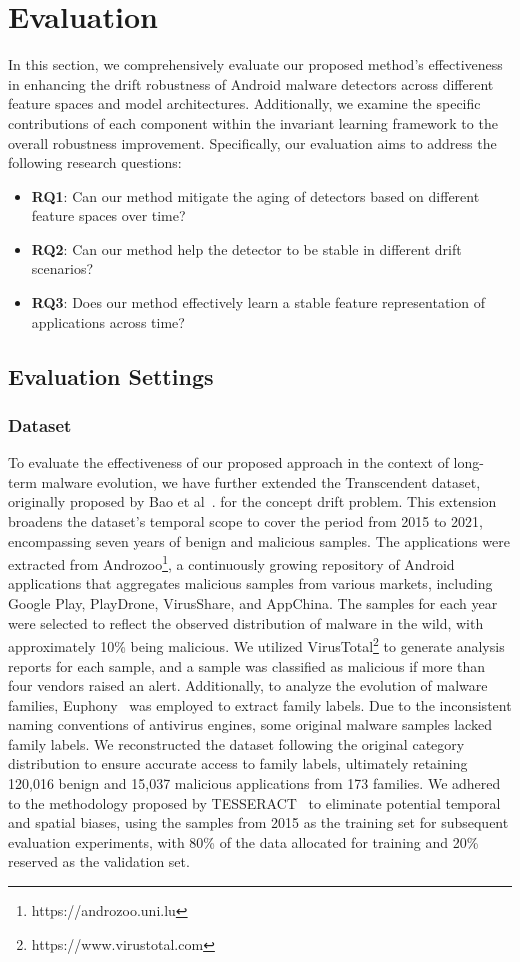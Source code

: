 \section{Evaluation}
In this section, we comprehensively evaluate our proposed method's effectiveness in enhancing the drift robustness of Android malware detectors across different feature spaces and model architectures. Additionally, we examine the specific contributions of each component within the invariant learning framework to the overall robustness improvement. Specifically, our evaluation aims to address the following research questions:
\begin{itemize}
    \item \textbf{RQ1}: Can our method mitigate the aging of detectors based on different feature spaces over time?
    \item \textbf{RQ2}: Can our method help the detector to be stable in different drift scenarios?
    \item \textbf{RQ3}: Does our method effectively learn a stable feature representation of applications across time?
\end{itemize}

\subsection{Evaluation Settings}
\subsubsection{Dataset}
To evaluate the effectiveness of our proposed approach in the context of long-term malware evolution, we have further extended the Transcendent dataset, originally proposed by Bao et al~\cite{transcending}. for the concept drift problem. This extension broadens the dataset's temporal scope to cover the period from 2015 to 2021, encompassing seven years of benign and malicious samples.  The applications were extracted from Androzoo\footnote{https://androzoo.uni.lu}, a continuously growing repository of Android applications that aggregates malicious samples from various markets, including Google Play, PlayDrone, VirusShare, and AppChina. The samples for each year were selected to reflect the observed distribution of malware in the wild, with approximately 10\% being malicious. We utilized VirusTotal\footnote{https://www.virustotal.com} to generate analysis reports for each sample, and a sample was classified as malicious if more than four vendors raised an alert. Additionally, to analyze the evolution of malware families, Euphony~\cite{euphony} was employed to extract family labels. Due to the inconsistent naming conventions of antivirus engines, some original malware samples lacked family labels. We reconstructed the dataset following the original category distribution to ensure accurate access to family labels, ultimately retaining 120,016 benign and 15,037 malicious applications from 173 families. We adhered to the methodology proposed by TESSERACT~\cite{tesseract} to eliminate potential temporal and spatial biases, using the samples from 2015 as the training set for subsequent evaluation experiments, with 80\% of the data allocated for training and 20\% reserved as the validation set.


